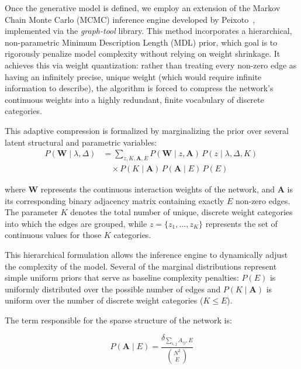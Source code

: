 \documentclass[10pt, aps, rmp,  twocolumn, superscriptaddress, floatfix, showkeys]{revtex4-2}
\begin{document}

Once the generative model is defined, we employ an extension of the Markov Chain Monte Carlo (MCMC) inference engine developed by Peixoto~\cite{peixoto2025network}, implemented via the \textit{graph-tool} library. 
This method incorporates a hierarchical, non-parametric Minimum Description Length (MDL) prior, which goal is to rigorously penalize model complexity without relying on weight shrinkage. It achieves this via weight quantization: rather than treating every non-zero edge as having an infinitely precise, unique weight (which would require infinite information to describe), the algorithm is forced to compress the network's continuous weights into a highly redundant, finite vocabulary of discrete categories. 

This adaptive compression is formalized by marginalizing the prior over several latent structural and parametric variables:
\begin{equation}
    \begin{aligned}
        P(\mathbf{W} \mid \lambda, \Delta) &= \sum_{z,K,\mathbf{A},E} P(\mathbf{W} \mid z, \mathbf{A})\, P(z \mid \lambda, \Delta, K)\, \\
        &\quad\times P(K \mid \mathbf{A})\,P(\mathbf{A} \mid E)\,P(E)
    \end{aligned}
    \label{eq:mdl_prior}
\end{equation}

where $\mathbf{W}$ represents the continuous interaction weights of the network, and $\mathbf{A}$ is its corresponding binary adjacency matrix containing exactly $E$ non-zero edges. The parameter $K$ denotes the total number of unique, discrete weight categories into which the edges are grouped, while $z = \{z_1, \dots, z_K\}$ represents the set of continuous values for those $K$ categories.

This hierarchical formulation allows the inference engine to dynamically adjust the complexity of the model. Several of the marginal distributions represent simple uniform priors that serve as baseline complexity penalties: $P(E)$ is uniformly distributed over the possible number of edges and $P(K \mid \mathbf{A})$ is uniform over the number of discrete weight categories ($K \le E$).

The term responsible for the sparse structure of the network is:

\begin{equation} 
    P(\mathbf{A} \mid E) = \frac{\delta_{\sum_{i,j}A_{ij}, E}}{\binom{N^2}{E}} 
\end{equation}
\end{document}
